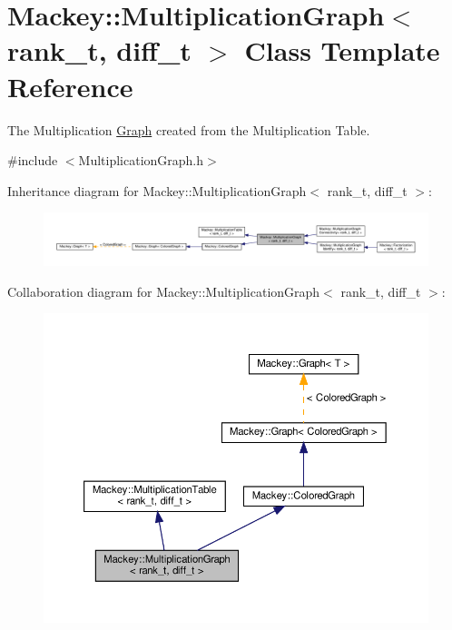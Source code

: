 \hypertarget{classMackey_1_1MultiplicationGraph}{}\section{Mackey\+:\+:Multiplication\+Graph$<$ rank\+\_\+t, diff\+\_\+t $>$ Class Template Reference}
\label{classMackey_1_1MultiplicationGraph}


The Multiplication \hyperlink{classMackey_1_1Graph}{Graph} created from the Multiplication Table.  




{\ttfamily \#include $<$Multiplication\+Graph.\+h$>$}



Inheritance diagram for Mackey\+:\+:Multiplication\+Graph$<$ rank\+\_\+t, diff\+\_\+t $>$\+:\nopagebreak
\begin{figure}[H]
\begin{center}
\leavevmode
\includegraphics[width=350pt]{classMackey_1_1MultiplicationGraph__inherit__graph}
\end{center}
\end{figure}


Collaboration diagram for Mackey\+:\+:Multiplication\+Graph$<$ rank\+\_\+t, diff\+\_\+t $>$\+:\nopagebreak
\begin{figure}[H]
\begin{center}
\leavevmode
\includegraphics[width=350pt]{classMackey_1_1MultiplicationGraph__coll__graph}
\end{center}
\end{figure}
